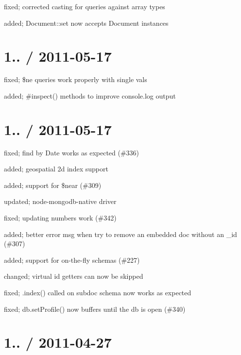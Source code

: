\begin{DoxyItemize}
\item fixed; corrected casting for queries against array types
\item added; Document\+::set now accepts Document instances
\end{DoxyItemize}

\section*{1.. / 2011-\/05-\/17 }


\begin{DoxyItemize}
\item fixed; \$ne queries work properly with single vals
\item added; \#inspect() methods to improve console.\+log output
\end{DoxyItemize}

\section*{1.. / 2011-\/05-\/17 }


\begin{DoxyItemize}
\item fixed; find by Date works as expected (\#336)
\item added; geospatial 2d index support
\item added; support for \$near (\#309)
\item updated; node-\/mongodb-\/native driver
\item fixed; updating numbers work (\#342)
\item added; better error msg when try to remove an embedded doc without an \+\_\+id (\#307)
\item added; support for \textquotesingle{}on-\/the-\/fly\textquotesingle{} schemas (\#227)
\item changed; virtual id getters can now be skipped
\item fixed; .index() called on subdoc schema now works as expected
\item fixed; db.\+set\+Profile() now buffers until the db is open (\#340)
\end{DoxyItemize}

\section*{1.. / 2011-\/04-\/27 }


